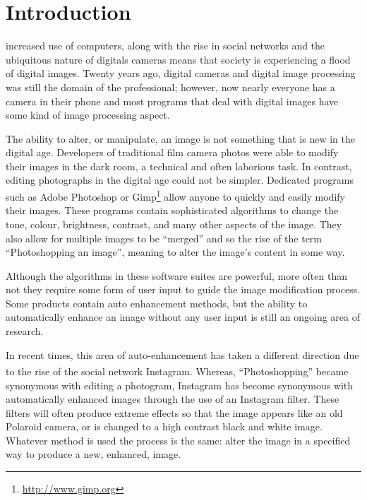\documentclass[journal,transmag]{IEEEtran}
\begin{document}
\section{Introduction}

% 
% 
% 
% 
 increased use of computers, along with the rise in social networks and the ubiquitous nature of digitals cameras means that society is experiencing a flood of digital images.  Twenty years ago, digital cameras and digital image processing was still the domain of the professional; however, now nearly everyone has a camera in their phone and most programs that deal with digital images have some kind of image processing aspect. 

The ability to alter, or manipulate, an image is not something that is new in the digital age.  Developers of traditional film camera photos were able to modify their images in the dark room, a technical and often laborious task.  In contrast, editing photographs in the digital age could not be simpler.  Dedicated programs such as Adobe\textsuperscript{\texttrademark} Photoshop\textsuperscript{\textregistered} or Gimp\footnote{\url{http://www.gimp.org}} allow anyone to quickly and easily modify their images.  These programs contain sophisticated algorithms to change the tone, colour, brightness, contrast, and many other aspects of the image.  They also allow for multiple images to be ``merged'' and so the rise of the term ``Photoshopping an image'', meaning to alter the image's content in some way.

Although the algorithms in these software suites are powerful, more often than not they require some form of user input to guide the image modification process.  Some products contain auto enhancement methods, but the ability to automatically enhance an image without any user input is still an ongoing area of research.

In recent times, this area of auto-enhancement has taken a different direction due to the rise of the social network Instagram\textsuperscript{\texttrademark}.  Whereas, ``Photoshopping'' became synonymous with editing a photogram, Instagram has become synonymous with automatically enhanced images through the use of an Instagram filter.  These filters will often produce extreme effects so that the image appears like an old Polaroid camera, or is changed to a high contrast black and white image.  Whatever method is used the process is the same: alter the image in a specified way to produce a new, enhanced, image.
\end{document}
